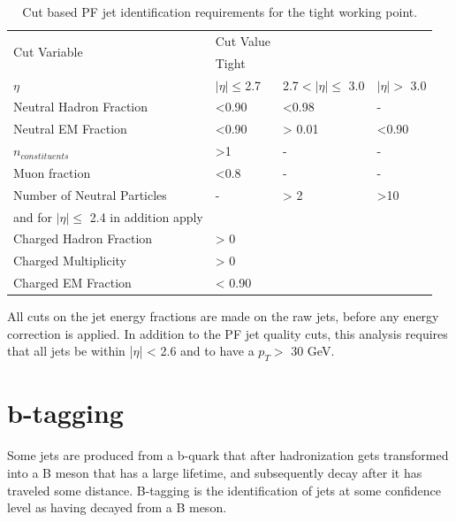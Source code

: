 \begin{table}[htbp]
    \caption{Cut based PF jet identification requirements for the tight working point.}
    \centering
    \begin{tabular}{llll}
        \hline
        \multirow{2}{*}{Cut Variable}               & Cut Value \\\cline{2-2}
                                                    & Tight\\ 
        \hline 
        $\eta$& $|\eta|\leq$2.7 &2.7$<|\eta|\leq$ 3.0  & $|\eta|>$ 3.0\\
        \hline 
        Neutral Hadron Fraction  & <0.90  & <0.98 & -\\  
        Neutral EM Fraction      & <0.90  & > 0.01 & <0.90\\
        $n_{constituents}$       & >1     & -      & - \\
        Muon fraction            & <0.8   & -      & -\\
        Number of Neutral Particles & - & > 2      & >10\\
        \hline
        and for $|\eta| \leq$ 2.4 in addition apply\\
        \hline
        Charged Hadron Fraction & > 0 \\
        Charged Multiplicity    & > 0 \\
        Charged EM Fraction     & < 0.90\\
        \hline 
    \end{tabular}
    \label{tab:PFJetID}
\end{table}

All cuts on the jet energy fractions are made on the raw jets, before any energy correction is applied. In addition to the PF jet quality cuts, this analysis requires that all jets be within |$\eta$| < 2.6 and to have a $p_{T} > $ 30 GeV. 

\section{b-tagging}
Some jets are produced from a b-quark that after hadronization gets transformed into a B meson that has a large lifetime, and subsequently decay after it has traveled some distance. B-tagging is the identification of jets at some confidence level as having decayed from a B meson.

